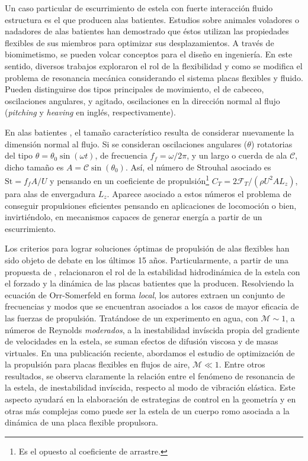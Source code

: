 \documentclass[12pt]{article}
\begin{document}
Un caso particular de escurrimiento de estela con fuerte interacción fluido estructura es el que producen alas batientes.  Estudios sobre animales voladores o nadadores de alas batientes\cite{Dickson:2004p232,harrison2000} han demostrado que éstos utilizan las propiedades flexibles de sus miembros para optimizar sus desplazamientos. A través de biomimetismo, se pueden volcar conceptos para el diseño en ingeniería. En este sentido,
diversos trabajos\cite{marais2012,ramananarivo2011a,dewey2013,paraz2016thrust} exploraron el rol de la flexibilidad y como se modifica el problema de resonancia mecánica
considerando el sistema placas flexibles y fluido. Pueden distinguirse dos tipos principales de movimiento, el de cabeceo, oscilaciones angulares, y agitado, oscilaciones en la dirección  normal al flujo (\textit{pitching} y \textit{heaving} en inglés, respectivamente).

En alas batientes , el tamaño característico resulta de considerar nuevamente la dimensión normal al flujo. Si se consideran oscilaciones angulares ($\theta$) rotatorias del tipo $\theta = \theta_0\sin(\omega t)$, de frecuencia $f_f = \omega/2\pi$, y un largo o cuerda de ala $\mathscr C$, dicho tamaño es $A=\mathscr{C} \sin(\theta_0)$. Así, el número de Strouhal asociado es $\mathrm{St}=f_f A / U$ y pensando en un coeficiente de propulsión\footnote{Es el opuesto al coeficiente de arrastre.} $C_T=2\mathscr{F}_T/(\rho U^2 A L_z)$, para alas de envergadura $L_z$. Aparece asociado a estos números el problema de conseguir propulsiones eficientes pensando en aplicaciones de locomoción o bien, invirtiéndolo, en mecanismos capaces de generar energía a partir de un escurrimiento.

Los criterios para lograr soluciones óptimas de propulsión de alas flexibles han sido objeto de debate en los últimos 15 años.  Particularmente, a partir de una propuesta de \citet{Triantafyllou:2002p282},  \citet{moored2012hydrodynamic} relacionaron el rol de la estabilidad hidrodinámica de la estela con el forzado y la dinámica de las placas batientes  que la producen. Resolviendo la ecuación de Orr-Somerfeld en forma \textit{local}, los autores extraen un conjunto de frecuencias  y modos que se encuentran asociados a los casos de mayor eficacia de las fuerzas de propulsión. Tratándose de un experimento en agua, con $\mathcal{M}\sim 1$, a números de Reynolds \textit{moderados}, a la inestabilidad invíscida propia del gradiente de velocidades en la estela, se suman efectos  de difusión viscosa y de masas virtuales. 
En una publicación reciente\cite{dadamo2022wake}, abordamos el estudio de  optimización de la propulsión para placas flexibles en flujos de aire, $\mathcal{M}\ll 1$. Entre otros resultados, se observa claramente la relación entre el fenómeno de resonancia de la estela\cite{chomaz2005}, de inestabilidad invíscida\cite{charru2012instabilites}, respecto al modo de vibración elástica. Este aspecto ayudará en la elaboración de estrategias de control en la geometría y en otras más complejas como puede ser  la estela de un cuerpo romo asociada a la dinámica de una placa flexible  propulsora.
\end{document}
